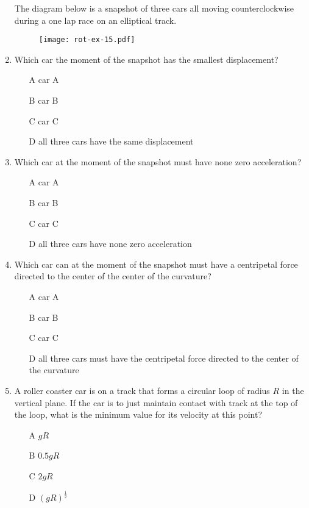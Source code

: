 \begin{enumerate}
The diagram below is a snapshot of three cars all moving counterclockwise during a 
one lap race on an elliptical track.  


\begin{figure}[H]
\centering
\texttt{[image: rot-ex-15.pdf]}
\end{figure}


\item Which car the moment of the snapshot has the smallest displacement?

\begin{itemize}
\item[A] car A
\item[B] car B
\item[C] car C
\item[D] all three cars have the same displacement 
\end{itemize}

\item Which car at the moment of the snapshot must have none zero acceleration?

\begin{itemize}
\item[A] car A
\item[B] car B
\item[C] car C
\item[D] all three cars have none zero acceleration
\end{itemize}


\item Which car can at the moment of the snapshot must have a centripetal force directed to the center of the center of the curvature?

\begin{itemize}
\item[A] car A
\item[B] car B
\item[C] car C
\item[D] all three cars must have the centripetal force directed to the center of the curvature
\end{itemize}


\item A roller coaster car is on a track that forms a circular loop of radius $R$ in the vertical plane.
If the car is to just maintain contact with track at the top of the loop, 
what is the minimum value for its velocity at this point? 

\begin{itemize}
\item[A] $gR$
\item[B] $0.5gR$
\item[C] $2gR$
\item[D] $(gR)^{\frac{1}{2}}$
\end{itemize}


\end{enumerate}
